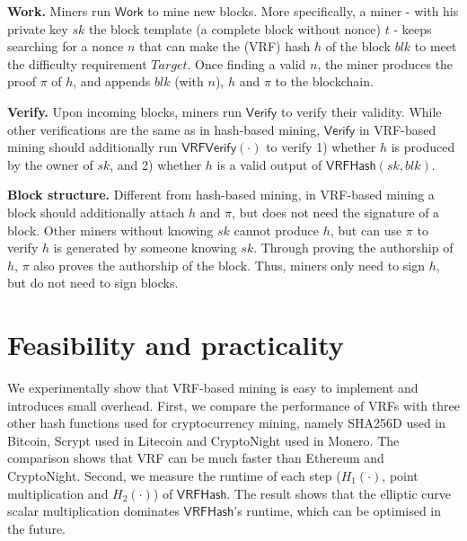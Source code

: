 \documentclass[a0,portrait]{a0poster}
\begin{document}
\begin{multicols}{2}
    \textbf{Work.}
    Miners run $\mathsf{Work}$ to mine new blocks.
    More specifically, a miner - with his private key $sk$ the block template (a complete block without nonce) $t$ - keeps searching for a nonce $n$ that can make the (VRF) hash $h$ of the block $blk$ to meet the difficulty requirement $Target$.
    Once finding a valid $n$, the miner produces the proof $\pi$ of $h$, and appends $blk$ (with $n$), $h$ and $\pi$ to the blockchain.

    \textbf{Verify.}
    Upon incoming blocks, miners run $\mathsf{Verify}$ to verify their validity.
    While other verifications are the same as in hash-based mining, $\mathsf{Verify}$ in VRF-based mining should additionally run $\mathsf{VRFVerify}(\cdot)$ to verify 1) whether $h$ is produced by the owner of $sk$, and 2) whether $h$ is a valid output of $\mathsf{VRFHash}(sk, blk)$.

    \textbf{Block structure.}
    Different from hash-based mining, in VRF-based mining a block should additionally attach $h$ and $\pi$, but does not need the signature of a block.
    Other miners without knowing $sk$ cannot produce $h$, but can use $\pi$ to verify $h$ is generated by someone knowing $sk$.
    Through proving the authorship of $h$, $\pi$ also proves the authorship of the block.
    Thus, miners only need to sign $h$, but do not need to sign blocks.


    \section*{Feasibility and practicality}

    We experimentally show that VRF-based mining is easy to implement and introduces small overhead.
    First, we compare the performance of VRFs with three other hash functions used for cryptocurrency mining, namely SHA256D used in Bitcoin, Scrypt used in Litecoin and CryptoNight used in Monero.
    The comparison shows that VRF can be much faster than Ethereum and CryptoNight.
    Second, we measure the runtime of each step ($H_1(\cdot)$, point multiplication and $H_2(\cdot)$) of $\mathsf{VRFHash}$.
    The result shows that the elliptic curve scalar multiplication dominates $\mathsf{VRFHash}$'s runtime, which can be optimised in the future.


\end{multicols}
\end{document}
